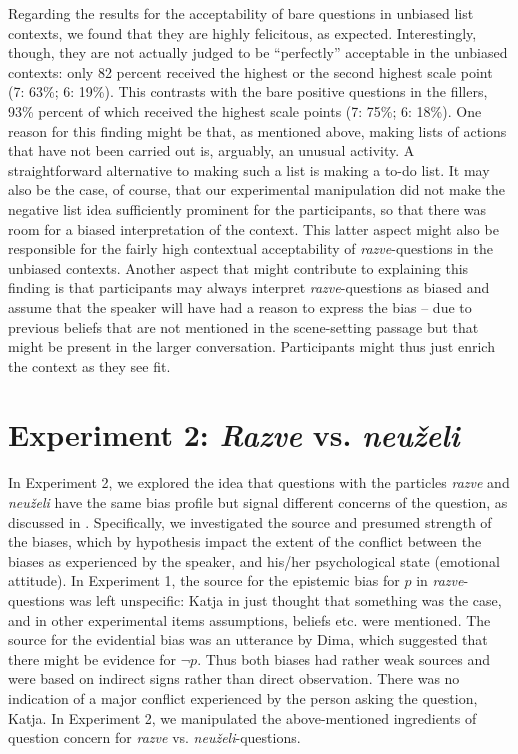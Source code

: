 \documentclass[output=paper,colorlinks,citecolor=brown]{langscibook}
\begin{document}
Regarding the results for the acceptability of bare questions in unbiased list contexts, we found that they are highly felicitous, as expected. Interestingly, though, they are not actually judged to be ``perfectly'' acceptable in the unbiased contexts: only 82 percent received the highest or the second highest scale point (7: 63\%; 6: 19\%). This contrasts with the bare positive questions in the fillers, 93\% percent of which received the highest scale points (7: 75\%; 6: 18\%). One reason for this finding might be that, as mentioned above, making lists of actions that have not been carried out is, arguably, an unusual activity. A straightforward alternative to making such a list is making a to-do list. It may also be the case, of course, that our experimental manipulation did not make the negative list idea sufficiently prominent for the participants, so that there was room for a biased interpretation of the context. This latter aspect might also be responsible for the fairly high contextual acceptability of \textit{razve}-questions in the unbiased contexts. Another aspect that might contribute to explaining this finding is that participants may always interpret \textit{razve}-questions as biased and assume that the speaker will have had a reason to express the bias – due to previous beliefs that are not mentioned in the scene-setting passage but that might be present in the larger conversation. Participants might thus just enrich the context as they see fit. 

\section{Experiment 2: \textit{Razve} vs. \textit{neuželi}}\label{sec:05:5}

In Experiment 2, we explored the idea that questions with the particles \textit{razve} and \textit{neuželi} have the same bias profile but signal different concerns of the question, as discussed in . Specifically, we investigated the source and presumed strength of the biases, which by hypothesis impact the extent of the conflict between the biases as experienced by the speaker, and his/her psychological state (emotional attitude). In Experiment 1, the source for the epistemic bias for $p$ in \textit{razve}-questions was left unspecific: Katja in  just thought that something was the case, and in other experimental items assumptions, beliefs etc. were mentioned. The source for the evidential bias was an utterance by Dima, which suggested that there might be evidence for $\neg p$. Thus both biases had rather weak sources and were based on indirect signs rather than direct observation. There was no indication of a major conflict experienced by the person asking the question, Katja. In Experiment 2, we manipulated the above-mentioned ingredients of question concern for \textit{razve} vs. \textit{neuželi}-questions.
\end{document}
